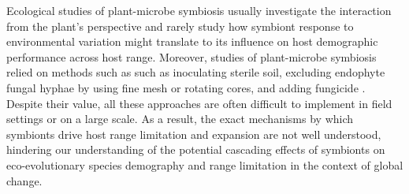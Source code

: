 \documentclass[11pt]{article}
\begin{document}
Ecological studies of plant-microbe symbiosis usually  investigate the interaction from the plant’s perspective and rarely  study how symbiont response to environmental variation might translate to its influence on host demographic performance across host range.
Moreover, studies of plant-microbe symbiosis relied on  methods such as  such as inoculating sterile soil, excluding endophyte fungal hyphae by using fine mesh or rotating cores, and adding fungicide \citep{bennett2022costs}. 
Despite their value, all these approaches are often difficult to implement in field settings or on a large scale.
As a result, the exact mechanisms by which symbionts drive host range limitation and expansion are not well understood, hindering our understanding of the potential cascading effects of symbionts on eco-evolutionary species demography and  range limitation in the context of global change.

\end{document}
